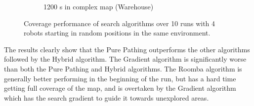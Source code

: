 \begin{figure}[H]
\begin{subfigure}[b]{0.49\textwidth}
      \caption{1200 s in complex map (Warehouse)}
  \end{subfigure}
    \caption{Coverage performance of search algorithms over 10 runs with 4 robots starting in random positions in the same environment.}
    \label{fig:coverage-benchmark}
\end{figure}

The results clearly show that the Pure Pathing outperforms the other algorithms followed by the Hybrid algorithm. The Gradient algorithm is significantly worse than both the Pure Pathing and Hybrid algorithms. The Roomba algorithm is generally better performing in the beginning of the run, but has a hard time getting full coverage of the map, and is overtaken by the Gradient algorithm which has the search gradient to guide it towards unexplored areas.


